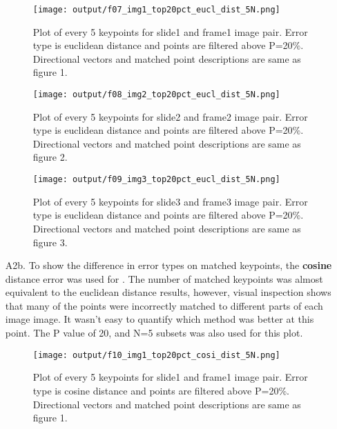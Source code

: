 \documentclass[12pt]{report}
\begin{document}
\begin{enumerate}
    \begin{figure}[H]
        \centering
        \texttt{[image: output/f07\_img1\_top20pct\_eucl\_dist\_5N.png]}
        \caption{Plot of every 5 keypoints for slide1 and frame1 image pair. Error type is euclidean distance and points are filtered above P=20\%. Directional 
        vectors and matched point descriptions are same as figure 1.}
        \label{fig:Figure7}
    \end{figure}

    \begin{figure}[H]
        \centering
        \texttt{[image: output/f08\_img2\_top20pct\_eucl\_dist\_5N.png]}
        \caption{Plot of every 5 keypoints for slide2 and frame2 image pair. Error type is euclidean distance and points are filtered above P=20\%. Directional 
        vectors and matched point descriptions are same as figure 2.}
        \label{fig:Figure8}
    \end{figure}

    \begin{figure}[H]
        \centering
        \texttt{[image: output/f09\_img3\_top20pct\_eucl\_dist\_5N.png]}
        \caption{Plot of every 5 keypoints for slide3 and frame3 image pair. Error type is euclidean distance and points are filtered above P=20\%. Directional 
        vectors and matched point descriptions are same as figure 3.}
        \label{fig:Figure9}
    \end{figure}

    \item[A2b.] To show the difference in error types on matched keypoints, the \textbf{cosine} distance error was used for .
    The number of matched keypoints was almost equivalent to the euclidean distance results, however, visual inspection shows that many of the points were incorrectly 
    matched to different parts of each image image. It wasn't easy to quantify which method was better at this point. The P value of 20, and N=5 subsets was also used for 
    this plot.

    \begin{figure}[H]
        \centering
        \texttt{[image: output/f10\_img1\_top20pct\_cosi\_dist\_5N.png]}
        \caption{Plot of every 5 keypoints for slide1 and frame1 image pair. Error type is cosine distance and points are filtered above P=20\%. Directional 
        vectors and matched point descriptions are same as figure 1.}
        \label{fig:Figure10}
    \end{figure}


\end{enumerate}
\end{document}
